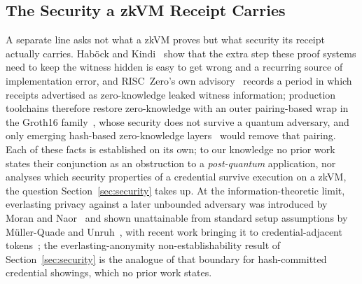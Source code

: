 \subsection{The Security a zkVM Receipt Carries}\label{ssec:zkvm-proof-security}
A separate line asks not what a zkVM proves but what security its receipt actually carries. Hab\"ock and Kindi~\cite{cryptoeprint:2024/1037} show that the extra step these proof systems need to keep the witness hidden is easy to get wrong and a recurring source of implementation error, and RISC~Zero's own advisory~\cite{risc0zkadvisory} records a period in which receipts advertised as zero-knowledge leaked witness information; production toolchains therefore restore zero-knowledge with an outer pairing-based wrap in the Groth16 family~\cite{groth2016,succinct2025prooftypes}, whose security does not survive a quantum adversary, and only emerging hash-based zero-knowledge layers~\cite{cryptoeprint:2026/683} would remove that pairing. Each of these facts is established on its own; to our knowledge no prior work states their conjunction as an obstruction to a \emph{post-quantum} application, nor analyses which security properties of a credential survive execution on a zkVM, the question Section~\ref{sec:security} takes up. At the information-theoretic limit, everlasting privacy against a later unbounded adversary was introduced by Moran and Naor~\cite{morannaor2006} and shown unattainable from standard setup assumptions by M\"uller-Quade and Unruh~\cite{muellerquade2010}, with recent work bringing it to credential-adjacent tokens~\cite{cryptoeprint:2025/1030}; the everlasting-anonymity non-establishability result of Section~\ref{sec:security} is the analogue of that boundary for hash-committed credential showings, which no prior work states.

